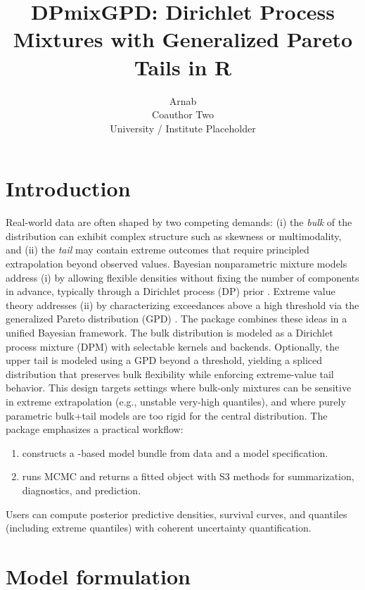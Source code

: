 \documentclass[article]{jss}\usepackage[]{graphicx}\usepackage[]{xcolor}
\title{DPmixGPD: Dirichlet Process Mixtures with Generalized Pareto Tails in R}
\author{Arnab \\ Coauthor Two \\
  University / Institute Placeholder
}
\begin{document}
\maketitle

\section{Introduction}

Real-world data are often shaped by two competing demands: (i) the \emph{bulk} of the distribution can exhibit complex structure such as skewness or multimodality, and (ii) the \emph{tail} may contain extreme outcomes that require principled extrapolation beyond observed values.
Bayesian nonparametric mixture models address (i) by allowing flexible densities without fixing the number of components in advance, typically through a Dirichlet process (DP) prior \citep{Ferguson1973, Neal2000}.
Extreme value theory addresses (ii) by characterizing exceedances above a high threshold via the generalized Pareto distribution (GPD) \citep{Pickands1975, DeHaanFerreira2006}.
The  package combines these ideas in a unified Bayesian framework.
The bulk distribution is modeled as a Dirichlet process mixture (DPM) with selectable kernels and backends.
Optionally, the upper tail is modeled using a GPD beyond a threshold, yielding a spliced distribution that preserves bulk flexibility while enforcing extreme-value tail behavior.
This design targets settings where bulk-only mixtures can be sensitive in extreme extrapolation (e.g., unstable very-high quantiles), and where purely parametric bulk+tail models are too rigid for the central distribution.
The package emphasizes a practical workflow:
\begin{enumerate}
  \item {} constructs a -based model bundle from data and a model specification.
  \item {} runs MCMC and returns a fitted object with S3 methods for summarization, diagnostics, and prediction.
\end{enumerate}
Users can compute posterior predictive densities, survival curves, and quantiles (including extreme quantiles) with coherent uncertainty quantification.

\section{Model formulation}
\end{document}
